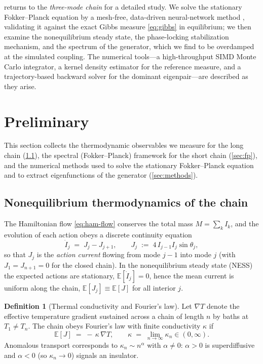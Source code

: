 \documentclass[11pt,a4paper]{article}
\theoremstyle{definition}
\newtheorem{definition}[theorem]{Definition}
\newcommand{\E}{\mathbb{E}}
\numberwithin{equation}{section}   %
\begin{document}
 returns to the \emph{three-mode chain} for a detailed
study. We solve the stationary Fokker--Planck equation by a mesh-free,
data-driven neural-network method \cite{ZhaiDobsonLi}, validating it against the
exact Gibbs measure \eqref{eq:gibbs} in equilibrium; we then examine the
nonequilibrium steady state, the phase-locking stabilization mechanism, and the
spectrum of the generator, which we find to be overdamped at the simulated
coupling. The numerical tools---a high-throughput SIMD Monte Carlo integrator, a
kernel density estimator for the reference measure, and a trajectory-based
backward solver for the dominant eigenpair---are described as they arise.


\section{Preliminary}

This section collects the thermodynamic observables we measure for the long
chain (\cref{sec:thermo}), the spectral (Fokker--Planck) framework for the
short chain (\cref{sec:fp}), and the numerical methods used to solve the
stationary Fokker--Planck equation and to extract eigenfunctions of the
generator (\cref{sec:methods}).

\subsection{Nonequilibrium thermodynamics of the chain}\label{sec:thermo}

The Hamiltonian flow \eqref{eq:ham-flow} conserves the total mass
$M=\sum_k I_k$, and the evolution of each action obeys a discrete continuity
equation
\begin{equation}\label{eq:continuity}
  \dot I_j \;=\; J_j - J_{j+1},
  \qquad
  J_j \;:=\; 4\, I_{j-1} I_j \sin\theta_j ,
\end{equation}
so that $J_j$ is the \emph{action current} flowing from mode $j-1$ into mode
$j$ (with $J_1=J_{n+1}=0$ for the closed chain). In the nonequilibrium steady
state (NESS) the expected actions are stationary, $\E[\dot I_j]=0$, hence the
mean current is uniform along the chain, $\E[J_j]\equiv \E[J]$ for all interior
$j$.

\begin{definition}[Thermal conductivity and Fourier's law]\label{de:fourier}
Let $\nabla T$ denote the effective temperature gradient sustained across a
chain of length $n$ by baths at $T_1\neq T_n$. The chain obeys Fourier's law
with finite conductivity $\kappa$ if
\begin{equation}\label{eq:fourier}
  \E[J] \;=\; -\,\kappa\,\nabla T,
  \qquad
  \kappa \;=\; \lim_{n\to\infty}\kappa_n \in (0,\infty).
\end{equation}
Anomalous transport corresponds to $\kappa_n\sim n^{\alpha}$ with $\alpha\neq0$:
$\alpha>0$ is superdiffusive and $\alpha<0$ (so $\kappa_n\to0$) signals an
insulator.
\end{definition}
\end{document}
